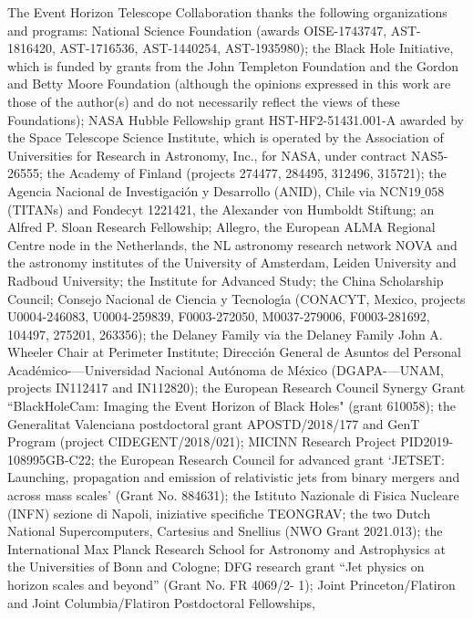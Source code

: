 The Event Horizon Telescope Collaboration thanks the following
organizations and programs: 
National Science Foundation (awards OISE-1743747, AST-1816420, AST-1716536, AST-1440254, AST-1935980);
the Black Hole Initiative, which is funded by grants from the John Templeton Foundation and the Gordon 
and Betty Moore Foundation (although the opinions expressed in this work are those of the author(s) 
and do not necessarily reflect the views of these Foundations);
NASA Hubble Fellowship grant
HST-HF2-51431.001-A awarded by the Space Telescope
Science Institute, which is operated by the Association
of Universities for Research in Astronomy, Inc.,
for NASA, under contract NAS5-26555;
the Academy
of Finland (projects 274477, 284495, 312496, 315721); the Agencia Nacional de Investigación 
y Desarrollo (ANID), Chile via NCN$19\_058$ (TITANs) and Fondecyt 1221421, the Alexander
von Humboldt Stiftung; an Alfred P. Sloan Research Fellowship;
Allegro, the European ALMA Regional Centre node in the Netherlands, the NL astronomy
research network NOVA and the astronomy institutes of the University of Amsterdam, Leiden University and Radboud University;
the Institute for Advanced Study;
the China Scholarship
Council;  Consejo
Nacional de Ciencia y Tecnolog\'{\i}a (CONACYT,
Mexico, projects  U0004-246083, U0004-259839, F0003-272050, M0037-279006, F0003-281692,
104497, 275201, 263356);
the Delaney Family via the Delaney Family John A.
Wheeler Chair at Perimeter Institute; Dirección General
de Asuntos del Personal Académico-—Universidad
Nacional Autónoma de México (DGAPA-—UNAM,
projects IN112417 and IN112820); the European Research Council Synergy
Grant ``BlackHoleCam: Imaging the Event Horizon
of Black Holes" (grant 610058); the Generalitat
Valenciana postdoctoral grant APOSTD/2018/177 and
GenT Program (project CIDEGENT/2018/021); MICINN Research Project PID2019-108995GB-C22;
the European Research Council for advanced grant `JETSET: Launching, propagation and 
emission of relativistic 
jets from binary mergers and across mass scales' (Grant No. 884631); 
the Istituto Nazionale di Fisica
Nucleare (INFN) sezione di Napoli, iniziative specifiche
TEONGRAV; the two Dutch National Supercomputers, Cartesius and Snellius  
(NWO Grant 2021.013);
the International Max Planck Research
School for Astronomy and Astrophysics at the
Universities of Bonn and Cologne; 
DFG research grant ``Jet physics on horizon scales and beyond'' (Grant No. FR 4069/2- 1);
Joint Princeton/Flatiron and Joint Columbia/Flatiron Postdoctoral Fellowships, 
